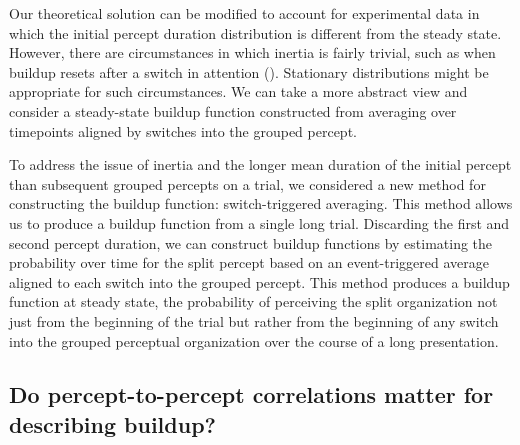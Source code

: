 Our theoretical solution can be modified to account for experimental data in which the initial percept duration distribution is different from the steady state. However, there are circumstances in which inertia is fairly trivial, such as when buildup resets after a switch in attention (\cite{Denham2010}). Stationary distributions might be appropriate for such circumstances. We can take a more abstract view and consider a steady-state buildup function constructed from averaging over timepoints aligned by switches into the grouped percept.

To address the issue of inertia and the longer mean duration of the initial percept than subsequent grouped percepts on a trial, we considered a new method for constructing the buildup function: switch-triggered averaging. This method allows us to produce a buildup function from a single long trial. Discarding the first and second percept duration, we can construct buildup functions by estimating the probability over time for the split percept based on an event-triggered average aligned to each switch into the grouped percept. This method produces a buildup function at steady state, the probability of perceiving the split organization not just from the beginning of the trial but rather from the beginning of any switch into the grouped perceptual organization over the course of a long presentation. 

\subsection{Do percept-to-percept correlations matter for describing buildup?}

